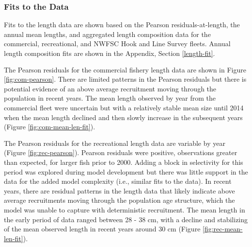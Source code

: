 \documentclass[11pt,
  english,
  a4paper,
]{article}
\begin{document}
\leavevmode\tagmcend\tagstructend\par


\hypertarget{fits-to-the-data}{%
\subsubsection{Fits to the Data}\label{fits-to-the-data}}

\leavevmode\tagmcend\tagstructend


Fits to the length data are shown based on the Pearson residuals-at-length, the annual mean lengths, and aggregated length composition data for the commercial, recreational, and NWFSC Hook and Line Survey fleets. Annual length composition fits are shown in the Appendix, Section \ref{length-fit}.

\leavevmode\tagmcend\tagstructend\par


The Pearson residuals for the commercial fishery length data are shown in Figure \ref{fig:com-pearson}. There are limited patterns in the Pearson residuals but there is potential evidence of an above average recruitment moving through the population in recent years. The mean length observed by year from the commercial fleet were uncertain but with a relatively stable mean size until 2014 when the mean length declined and then slowly increase in the subsequent years (Figure \ref{fig:com-mean-len-fit}).

\leavevmode\tagmcend\tagstructend\par


The Pearson residuals for the recreational length data are variable by year (Figure \ref{fig:rec-pearson}). Pearson residuals were positive, observations greater than expected, for larger fish prior to 2000. Adding a block in selectivity for this period was explored during model development but there was little support in the data for the added model complexity (i.e., similar fits to the data). In recent years, there are residual patterns in the length data that likely indicate above average recruitments moving through the population age structure, which the model was unable to capture with deterministic recruitment. The mean length in the early period of data ranged between 28 - 38 cm, with a decline and stabilizing of the mean observed length in recent years around 30 cm (Figure \ref{fig:rec-mean-len-fit}).
\end{document}
